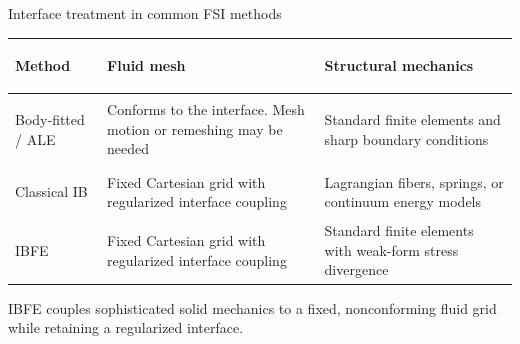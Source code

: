 \documentclass[aspectratio=169,11pt]{beamer}
\begin{document}
\begin{frame}{Interface treatment in common FSI methods}
\small
\renewcommand{\arraystretch}{1.35}
\begin{tabularx}{\textwidth}{
  >{\bfseries\raggedright\arraybackslash}p{}
  >{\raggedright\arraybackslash}X
  >{\raggedright\arraybackslash}X}
\toprule
Method & Fluid mesh & Structural mechanics \\
\midrule
Body-fitted / ALE
  & Conforms to the interface. Mesh motion or remeshing may be needed
  & Standard finite elements and sharp boundary conditions \\
Classical IB
  & Fixed Cartesian grid with regularized interface coupling
  & Lagrangian fibers, springs, or continuum energy models \\
IBFE
  & Fixed Cartesian grid with regularized interface coupling
  & Standard finite elements with weak-form stress divergence \\
\bottomrule
\end{tabularx}

\medskip
\begin{punchbox}
IBFE couples sophisticated solid mechanics to a fixed, nonconforming fluid grid while retaining a regularized interface.
\end{punchbox}
\end{frame}
\end{document}
